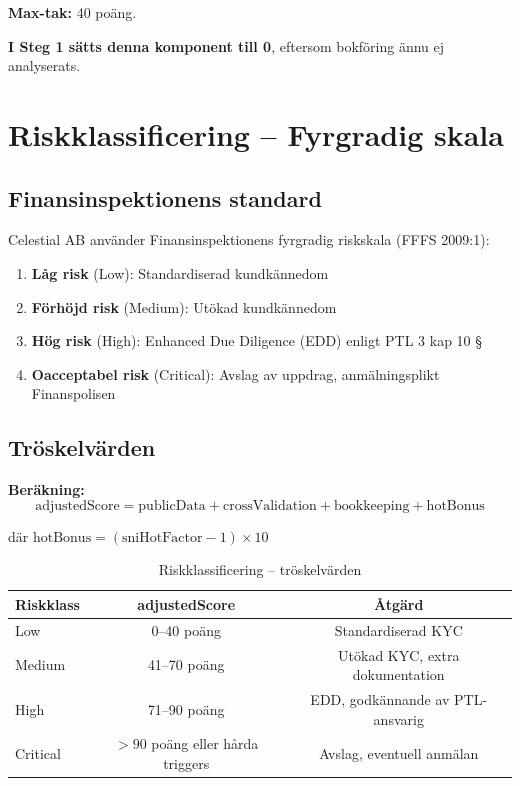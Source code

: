 \documentclass[12pt,a4paper]{article}
\begin{document}
\textbf{Max-tak:} 40 poäng.

\textbf{I Steg 1 sätts denna komponent till 0}, eftersom bokföring ännu ej analyserats.

\section{Riskklassificering – Fyrgradig skala}

\subsection{Finansinspektionens standard}

Celestial AB använder Finansinspektionens fyrgradig riskskala (FFFS 2009:1):

\begin{enumerate}[noitemsep]
  \item \textbf{Låg risk} (Low): Standardiserad kundkännedom
  \item \textbf{Förhöjd risk} (Medium): Utökad kundkännedom
  \item \textbf{Hög risk} (High): Enhanced Due Diligence (EDD) enligt PTL 3 kap 10 §
  \item \textbf{Oacceptabel risk} (Critical): Avslag av uppdrag, anmälningsplikt Finanspolisen
\end{enumerate}

\subsection{Tröskelvärden}

\textbf{Beräkning:}
\begin{equation}
\text{adjustedScore} = \text{publicData} + \text{crossValidation} + \text{bookkeeping} + \text{hotBonus}
\end{equation}

där $\text{hotBonus} = (\text{sniHotFactor} - 1) \times 10$

\begin{table}[h]
\centering
\begin{tabular}{lcc}
\toprule
\textbf{Riskklass} & \textbf{adjustedScore} & \textbf{Åtgärd} \\
\midrule
Low & 0–40 poäng & Standardiserad KYC \\
Medium & 41–70 poäng & Utökad KYC, extra dokumentation \\
High & 71–90 poäng & EDD, godkännande av PTL-ansvarig \\
Critical & $> 90$ poäng eller hårda triggers & Avslag, eventuell anmälan \\
\bottomrule
\end{tabular}
\caption{Riskklassificering – tröskelvärden}
\end{table}
\end{document}
